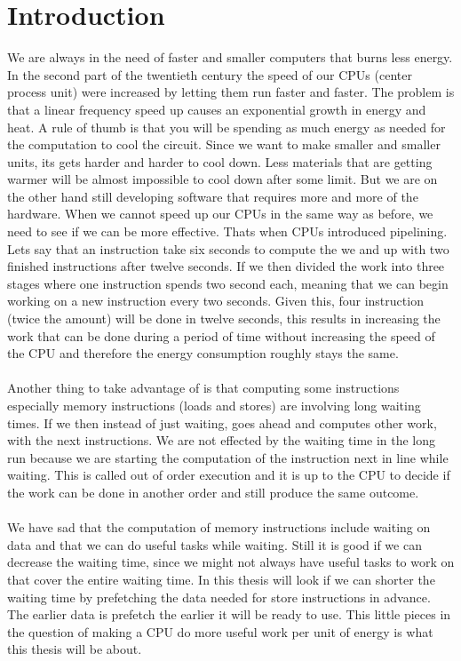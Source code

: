 \chapter{Introduction}
\label{chap:In}
We are always in the need of faster and smaller computers that burns less energy. In
the second part of the twentieth century the speed of our CPUs (center process unit)
were increased by letting them run faster and faster. The problem is that a linear
frequency speed up causes an exponential growth in energy and heat. A rule of thumb
is that you will be spending as much energy as needed for the computation to cool the
circuit. Since we want to make smaller and smaller units, its gets harder and harder
to cool down. Less materials that are getting warmer will be almost impossible to
cool down after some limit. But we are on the other hand still developing software
that requires more and more of the hardware. When we cannot speed up our CPUs
in the same way as before, we need to see if we can be more effective. Thats when
CPUs introduced pipelining. Lets say that an instruction take six seconds to compute
the we and up with two finished instructions after twelve seconds. If we then divided
the work into three stages where one instruction spends two second each, meaning
that we can begin working on a new instruction every two seconds. Given this, four
instruction (twice the amount) will be done in twelve seconds, this results in increasing
the work that can be done during a period of time without increasing the speed
of the CPU and therefore the energy consumption roughly stays the same.
\\ \\
Another thing to take advantage of is that computing some instructions especially
memory instructions (loads and stores) are involving long waiting times. If we then
instead of just waiting, goes ahead and computes other work, with the next instructions.
We are not effected by the waiting time in the long run because we are starting
the computation of the instruction next in line while waiting. This is called out of
order execution and it is up to the CPU to decide if the work can be done in another
order and still produce the same outcome.
\\ \\
We have sad that the computation of memory instructions include waiting on data
and that we can do useful tasks while waiting. Still it is good if we can decrease the
waiting time, since we might not always have useful tasks to work on that cover the
entire waiting time. In this thesis will look if we can shorter the waiting time by
prefetching the data needed for store instructions in advance. The earlier data is
prefetch the earlier it will be ready to use. This little pieces in the question of making
a CPU do more useful work per unit of energy is what this thesis will be about.

